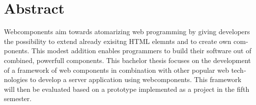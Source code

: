 \chapter{Abstract}

\begin{english}
	Webcomponents aim towards atomarizing web programming by giving developers the possibility to extend already exisitng HTML elemnts and to create own components. This modest addition enables programmers to build their software out of combined, powerfull components.
	This bachelor thesis focuses on the development of a framework of web components in combination with other popular web technologies to develop a server application using webcomponents. This framework will then be evaluated based on a prototype implemented as a project in the fifth semester.
	
	
\end{english}
